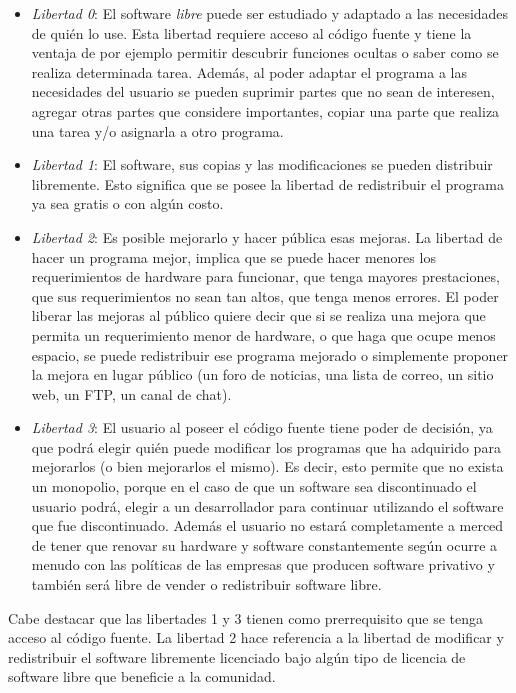 \begin{itemize}
\item \textit{Libertad 0}: El software \textit{libre} puede ser
  estudiado y adaptado a las necesidades de quién lo use. Esta
  libertad requiere acceso al código fuente y tiene la ventaja de por
  ejemplo permitir descubrir funciones ocultas o saber como se realiza
  determinada tarea. Además, al poder adaptar el programa a las
  necesidades del usuario se pueden suprimir partes que no sean de
  interesen, agregar otras partes que considere importantes, copiar
  una parte que realiza una tarea y/o asignarla a otro programa.
\item \textit{Libertad 1}: El software, sus copias y las
  modificaciones se pueden distribuir libremente. Esto significa que
  se posee la libertad de redistribuir el programa ya sea gratis o con
  algún costo.
\item \textit{Libertad 2}: Es posible mejorarlo y hacer pública esas
  mejoras. La libertad de hacer un programa mejor, implica que se
  puede hacer menores los requerimientos de hardware para funcionar,
  que tenga mayores prestaciones, que sus requerimientos no sean tan
  altos, que tenga menos errores. El poder liberar las mejoras al
  público quiere decir que si se realiza una mejora que permita un
  requerimiento menor de hardware, o que haga que ocupe menos espacio,
  se puede redistribuir ese programa mejorado o simplemente proponer
  la mejora en lugar público (un foro de noticias, una lista de
  correo, un sitio web, un FTP, un canal de chat).
\item \textit{Libertad 3}: El usuario al poseer el código fuente tiene
  poder de decisión, ya que podrá elegir quién puede modificar los
  programas que ha adquirido para mejorarlos (o bien mejorarlos el
  mismo). Es decir, esto permite que no exista un monopolio, porque en
  el caso de que un software sea discontinuado el usuario podrá,
  elegir a un desarrollador para continuar utilizando el software que
  fue discontinuado. Además el usuario no estará completamente a
  merced de tener que renovar su hardware y software constantemente
  según ocurre a menudo con las políticas de las empresas que producen
  software privativo y también será libre de vender o redistribuir
  software libre.
\end{itemize}

Cabe destacar que las libertades 1 y 3 tienen como prerrequisito que
se tenga acceso al código fuente. La libertad 2 hace referencia a la
libertad de modificar y redistribuir el software libremente licenciado
bajo algún tipo de licencia de software libre que beneficie a la
comunidad.



